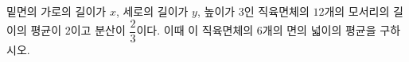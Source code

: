 밑면의 가로의 길이가 $x$, 세로의 길이가 $y$, 높이가 $3$인 직육면체의 $12$개의 모서리의 길이의 평균이 $2$이고 분산이 $\dfrac{2}{3}$이다. 이때 이 직육면체의 $6$개의 면의 넓이의 평균을 구하시오.
